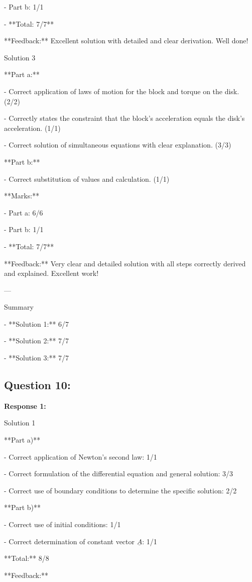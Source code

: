 \documentclass[a4paper,11pt]{article}
\begin{document}
- Part b: 1/1

- **Total: 7/7**

**Feedback:** Excellent solution with detailed and clear derivation. Well done!

Solution 3

**Part a:**

- Correct application of laws of motion for the block and torque on the disk. (2/2)

- Correctly states the constraint that the block's acceleration equals the disk's acceleration. (1/1)

- Correct solution of simultaneous equations with clear explanation. (3/3)

**Part b:**

- Correct substitution of values and calculation. (1/1)

**Marks:**

- Part a: 6/6

- Part b: 1/1

- **Total: 7/7**

**Feedback:** Very clear and detailed solution with all steps correctly derived and explained. Excellent work!

---

Summary

- **Solution 1:** 6/7

- **Solution 2:** 7/7

- **Solution 3:** 7/7


\subsection*{Question 10:}

\textbf{Response 1:}

Solution 1

**Part a)**

- Correct application of Newton's second law: 1/1

- Correct formulation of the differential equation and general solution: 3/3

- Correct use of boundary conditions to determine the specific solution: 2/2

**Part b)**

- Correct use of initial conditions: 1/1

- Correct determination of constant vector \( \underline{A} \): 1/1

**Total:** 8/8

**Feedback:** 
\end{document}
